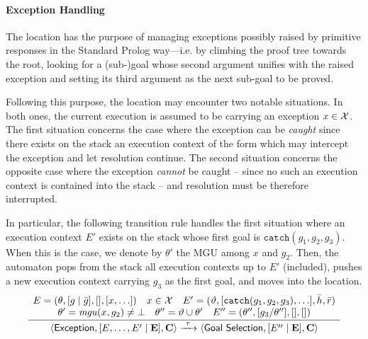 \documentclass[12pt,a4paper,openright,twoside]{book}
\begin{document}
\paragraph{Exception Handling}

The  location has the purpose of managing exceptions possibly raised by primitive responses in the Standard Prolog way---i.e. by climbing the proof tree towards the root, looking for a  (sub-)goal whose second argument unifies with the raised exception and setting its third argument as the next sub-goal to be proved.

Following this purpose, the  location may encounter two notable situations.
%
In both ones, the current execution is assumed to be carrying an exception $x \in \mathcal{X}$.
%
The first situation concerns the case where the exception can be \emph{caught} since there exists on the stack an execution context of the form  which may intercept the exception and let resolution continue.
%
The second situation concerns the opposite case where the exception \emph{cannot} be caught -- since no such an execution context is contained into the stack -- and resolution must be therefore interrupted.

In particular, the following transition rule handles the first situation where an execution context $E'$ exists on the stack whose first goal is $\mathtt{catch}(g_1, g_2, g_3)$.
%
When this is the case, we denote by $\theta'$ the MGU among $x$ and $g_2$.
%
Then, the automaton pops from the stack all execution contexts up to $E'$ (included), pushes a new execution context carrying $g_3$ as the first goal, and moves into the  location.
%
\[
\frac{
    \begin{array}{c}
        E = (\theta, [g \mid \bar{g}], [], [x, \ldots])
        \quad
        x \in \mathcal{X}
        \quad
        E' = (\vartheta, [\mathtt{catch}(g_1, g_2, g_3), \ldots], \bar{h}, \bar{r})
        \\
        \theta' = \mathit{mgu}(x, g_2) \neq \bot
        \quad
        \theta'' = \vartheta \cup \theta'
        \quad
        E'' = (\theta'', [g_3 / \theta''], [], [])
    \end{array}
}{
    \langle \textsf{Exception}, [E, \ldots, E' \mid \mathbf{E}], \mathbf{C} \rangle
    \xrightarrow{\ \tau\ }
    \langle \textsf{Goal Selection}, [E'' \mid \mathbf{E}], \mathbf{C} \rangle
}
\]
\end{document}
